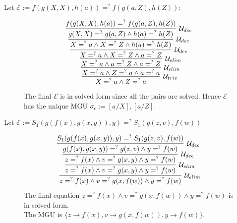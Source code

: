 \begin{example}[Unification]{}
Let $\mathcal{E} := f(g(X, X), h(a)) =^? f(g(a, Z), h(Z))$:

\begin{figure}[H]
    \centering
    \begin{tcolorbox}[colback=white, colframe=black, sharp corners, boxrule=0.5pt]
        \centering
        \vspace{0.3cm}
        \[
        \infer[\mathcal{U}_{triv}]
        {X =^? a \land Z =^? a}
        {
            \infer[\mathcal{U}_{elim}]
            {X =^? a \land Z =^? a \land a =^? a}
            {
                \infer[\mathcal{U}_{elim}]
                {X =^? a \land a =^? Z \land a =^? Z}
                {
                    \infer[\mathcal{U}_{dec}]
                    {X =^? a \land X =^? Z \land a =^? Z}
                    {
                        \infer[\mathcal{U}_{dec}]
                        {X =^? a \land X =^? Z \land h(a) =^? h(Z)}
                        {
                            \infer[\mathcal{U}_{dec}]
                            {g(X, X) =^? g(a, Z) \land h(a) =^? h(Z)}
                            {f(g(X, X), h(a)) =^? f(g(a, Z), h(Z))}
                        }
                    }
                }
            }
        }
        \]
        \vspace{0.1cm}
        The final $\mathcal{E}$ is in solved form since all the pairs are solved. Hence $\mathcal{E}$ has the unique MGU $\sigma_{\epsilon} := [a / X], [a / Z]$. 
    \end{tcolorbox}
\end{figure}
\end{example}

\begin{example}[Unification]{}
Let $\mathcal{E} := S_1(g(f(x), g(x, y)), y) =^? S_1(g(z, v), f(w))$

\begin{figure}[H]
    \centering
    \begin{tcolorbox}[colback=white, colframe=black, sharp corners, boxrule=0.5pt]
        \centering
        \vspace{0.3cm}
        \[
        \infer[\mathcal{U}_{elim}]
        {z =^? f(x) \land v =^? g(x, f(w)) \land y =^? f(w)}
        {
            \infer[\mathcal{U}_{elim}]
            {z =^? f(x) \land v =^? g(x, y) \land y =^? f(w)}
            {
                \infer[\mathcal{U}_{dec}]
                {z =^? f(x) \land v =^? g(x, y) \land y =^? f(w)}
                {
                    \infer[\mathcal{U}_{dec}]
                    {g(f(x), g(x, y)) =^? g(z, v) \land y =^? f(w)}
                    {S_1(g(f(x), g(x, y)), y) =^? S_1(g(z, v), f(w))}
                }
            }
        }
        \]
        \vspace{0.4cm}
        \flushleft
        The final equation $z =^? f(x) \land v =^? g(x, f(w)) \land y =^? f(w)$ is in solved form. \\
        The MGU is $\{z \to f(x), v \to g(x, f(w)), y \to f(w)\}$.
    \end{tcolorbox}
\end{figure}
\end{example}

